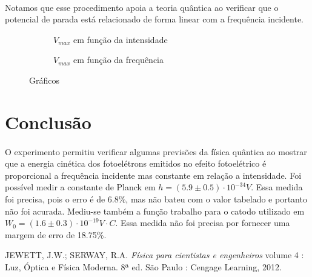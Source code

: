\documentclass[a4paper,11pt]{article}
\begin{document}
\paragraph{}Notamos que esse procedimento apoia a teoria
quântica ao verificar que o potencial de parada está
relacionado de forma linear com a frequência incidente.

\FloatBarrier

\begin{figure}
  \begin{subfigure}{\linewidth}
         
        \caption{$V_{max}$ em função da intensidade}
        \label{graph:A}
    \end{subfigure}
 
    \begin{subfigure}{\linewidth}
        
        \caption{$V_{max}$ em função da frequência}
        \label{graph:B}
   \end{subfigure}
   \caption{ Gráficos}
\end{figure}
\FloatBarrier

\section{Conclusão}

\paragraph{}O experimento permitiu verificar algumas previsões da
física quântica ao mostrar que a energia cinética dos
fotoelétrons emitidos no efeito fotoelétrico é proporcional
a frequência incidente mas constante em relação a
intensidade. Foi possível medir a constante de Planck em $h
= (5.9\pm 0.5) \cdot 10^{-34}V$. Essa medida foi precisa,
pois o erro é de 6.8\%, mas não bateu com o valor tabelado e
portanto 
não foi acurada. Mediu-se também a função trabalho para o catodo 
utilizado em $W_0 = (1.6\pm 0.3) \cdot 10^{-19}V \cdot C$.
Essa medida não foi precisa por fornecer uma margem de erro
de 18.75\%.

\begin{thebibliography}{9}    
  		JEWETT, J.W.; SERWAY, R.A.
  		\emph{Física para cientistas e engenheiros}
volume 4 : Luz, Óptica e Física Moderna.
 		 8ª ed.
 		 São Paulo : Cengage Learning, 2012.
 		\end{thebibliography}
\end{document}
